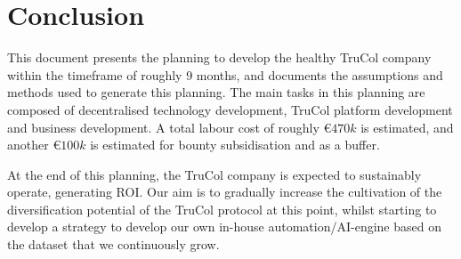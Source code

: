 \section{Conclusion}\label{sec:conclusion}
This document presents the planning to develop the healthy TruCol company within the timeframe of roughly 9 months, and documents the assumptions and methods used to generate this planning. The main tasks in this planning are composed of decentralised technology development, TruCol platform development and business development. A total labour cost of roughly \euro$470k$ is estimated, and another \euro$100k$ is estimated for bounty subsidisation and as a buffer.

At the end of this planning, the TruCol company is expected to sustainably operate, generating ROI. Our aim is to gradually increase the cultivation of the diversification potential of the TruCol protocol at this point, whilst starting to develop a strategy to develop our own in-house automation/AI-engine based on the dataset that we continuously grow.
